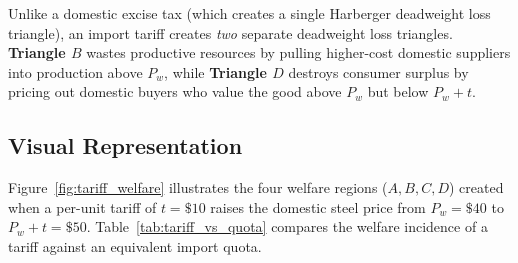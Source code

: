 \documentclass[11pt,letterpaper]{article}
\begin{document}
\begin{tcolorbox}[colback=CourseAmber!10!white,colframe=CourseOrange,title=\textbf{Clear It Up: Why Tariffs Create Two Deadweight Loss Triangles ($B + D$)}]
Unlike a domestic excise tax (which creates a single Harberger deadweight loss triangle), an import tariff creates \emph{two} separate deadweight loss triangles. \textbf{Triangle $B$} wastes productive resources by pulling higher-cost domestic suppliers into production above $P_w$, while \textbf{Triangle $D$} destroys consumer surplus by pricing out domestic buyers who value the good above $P_w$ but below $P_w + t$.
\end{tcolorbox}

\subsection*{Visual Representation}
Figure~\ref{fig:tariff_welfare} illustrates the four welfare regions ($A, B, C, D$) created when a per-unit tariff of $t = \$10$ raises the domestic steel price from $P_w = \$40$ to $P_w + t = \$50$. Table~\ref{tab:tariff_vs_quota} compares the welfare incidence of a tariff against an equivalent import quota.
\end{document}
